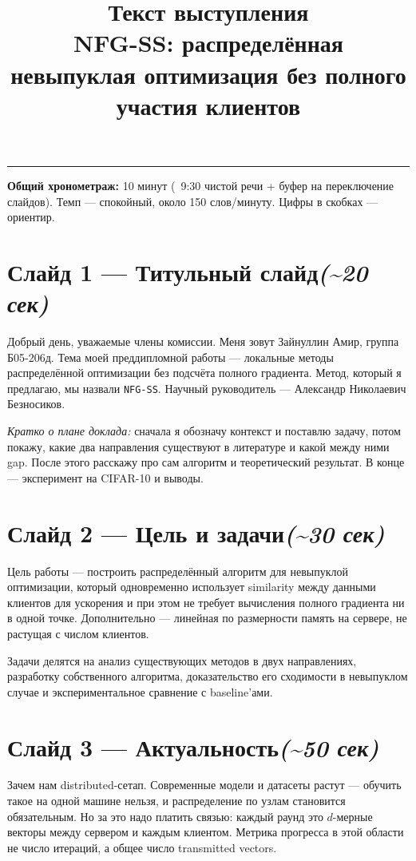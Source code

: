 \documentclass[11pt,a4paper]{article}
\title{\vspace{-1cm}\color{primary}\bfseries Текст выступления\\
{\large NFG-SS: распределённая невыпуклая оптимизация без полного участия клиентов}}
\author{}
\date{}
\newcommand{\slide}[3]{%
  \section*{Слайд #1 — #2\hfill\normalsize\color{lighttext}\textit{(\textasciitilde #3)}}%
}
\begin{document}
\maketitle
\thispagestyle{empty}

\vspace{-0.8cm}
{\color{accent}\rule{\linewidth}{0.8mm}}

\vspace{0.4cm}
\textbf{Общий хронометраж:} 10 минут (~9:30 чистой речи + буфер на переключение слайдов).
Темп — спокойный, около 150 слов/минуту. Цифры в скобках — ориентир.

\vspace{0.6cm}

\slide{1}{Титульный слайд}{20 сек}

Добрый день, уважаемые члены комиссии. Меня зовут Зайнуллин Амир, группа Б05-206д. Тема моей преддипломной работы — локальные методы распределённой оптимизации без подсчёта полного градиента. Метод, который я предлагаю, мы назвали \texttt{NFG-SS}. Научный руководитель — Александр Николаевич Безносиков.

\emph{Кратко о плане доклада:} сначала я обозначу контекст и поставлю задачу, потом покажу, какие два направления существуют в литературе и какой между ними gap. После этого расскажу про сам алгоритм и теоретический результат. В конце — эксперимент на CIFAR-10 и выводы.

\slide{2}{Цель и задачи}{30 сек}

Цель работы — построить распределённый алгоритм для невыпуклой оптимизации, который одновременно использует similarity между данными клиентов для ускорения и при этом не требует вычисления полного градиента ни в одной точке. Дополнительно — линейная по размерности память на сервере, не растущая с числом клиентов.

Задачи делятся на анализ существующих методов в двух направлениях, разработку собственного алгоритма, доказательство его сходимости в невыпуклом случае и экспериментальное сравнение с baseline'ами.

\slide{3}{Актуальность}{50 сек}

Зачем нам distributed-сетап. Современные модели и датасеты растут — обучить такое на одной машине нельзя, и распределение по узлам становится обязательным. Но за это надо платить связью: каждый раунд это $d$-мерные векторы между сервером и каждым клиентом. Метрика прогресса в этой области не число итераций, а общее число transmitted vectors.
\end{document}
